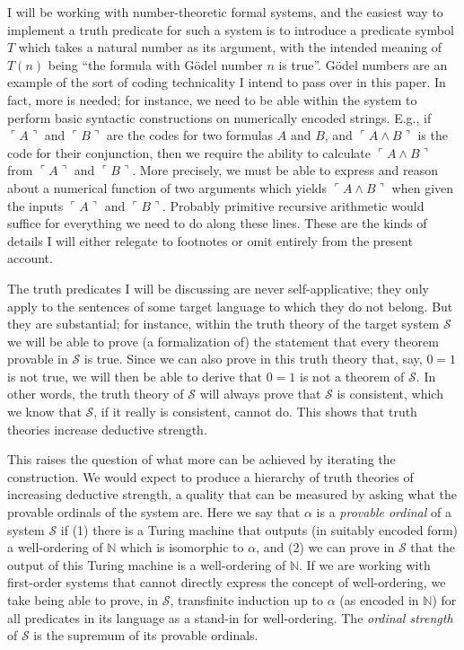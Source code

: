 \documentclass{amsart}
\begin{document}
I will be working with number-theoretic formal systems, and the easiest way to
implement a truth predicate for such a system is to introduce a predicate symbol $T$ which
takes a natural number as its argument, with the intended meaning of $T(n)$ being ``the
formula with G\"odel number $n$ is true''. G\"odel numbers are an example of the sort of
coding technicality I intend to pass over in this paper. In fact, more is needed; for
instance, we need to be able within the system to perform basic syntactic constructions on
numerically encoded strings. E.g., if $\ulcorner A\urcorner$ and $\ulcorner B\urcorner$ are the
codes for two formulas $A$ and $B$, and $\ulcorner A \wedge B \urcorner$ is the code for their
conjunction, then we require the ability to calculate $\ulcorner A \wedge B\urcorner$ from $\ulcorner A\urcorner$
and $\ulcorner B\urcorner$. More precisely, we must be able to express and reason about a numerical function
of two arguments which yields $\ulcorner A\wedge B\urcorner$ when given the inputs
$\ulcorner A\urcorner$ and $\ulcorner B\urcorner$. Probably primitive recursive arithmetic
would suffice for everything we need to do along these lines. These are the kinds of details I will
either relegate to footnotes or omit entirely from the present account.

The truth predicates I will be discussing are never self-applicative; they only apply to the sentences
of some target language to which they do not belong. But they are substantial; for instance,
within the truth theory of the target system $\mathcal{S}$ we will be able to prove (a formalization
of) the statement that every theorem provable in $\mathcal{S}$ is true. Since we can also prove in this
truth theory that, say, $0 = 1$ is not true, we will then be able to derive that $0 = 1$ is not a theorem
of $\mathcal{S}$. In other words, the truth theory of $\mathcal{S}$ will always prove that $\mathcal{S}$
is consistent, which we know that $\mathcal{S}$, if it really is consistent, cannot do. This shows that truth
theories increase deductive strength.

This raises the question of what more can be achieved by iterating the construction. We would expect
to produce a hierarchy of truth theories of increasing deductive strength, a quality that can be
measured by asking what the provable ordinals of the system are. Here we say that $\alpha$ is a
{\it provable ordinal} of a system $\mathcal{S}$ if (1) there is a Turing machine that outputs (in
suitably encoded form) a well-ordering of $\mathbb{N}$ which is isomorphic to $\alpha$,
and (2) we can prove in $\mathcal{S}$ that the output of this Turing machine is a well-ordering of
$\mathbb{N}$. If we are working with first-order systems that cannot directly express the concept
of well-ordering, we take being able to prove, in $\mathcal{S}$, transfinite induction up to $\alpha$
(as encoded in $\mathbb{N}$) for all predicates in its language as a stand-in for well-ordering.
The {\it ordinal strength} of $\mathcal{S}$ is the supremum of its provable ordinals.
\end{document}
